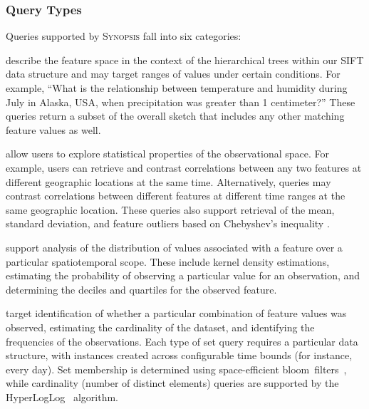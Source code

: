 \subsubsection{Query Types}
Queries supported by \textsc{Synopsis} fall into six categories:
\begin{description}[leftmargin=*]
    \item[Relational Queries] describe the feature space in the context of the hierarchical trees within our SIFT data structure and may target ranges of values under certain conditions. For example, ``What is the relationship between temperature and humidity during July in Alaska, USA, when precipitation was greater than 1 centimeter?'' These queries return a subset of the overall sketch that includes any other matching feature values as well.

    \item[Statistical Queries] allow users to explore statistical properties of the observational space. For example, users can retrieve and contrast correlations between any two features at different geographic locations at the same time. Alternatively, queries may contrast correlations between different features at different time ranges at the same geographic location. These queries also support retrieval of the mean, standard deviation, and feature outliers based on Chebyshev's inequality \cite{knuth1968art}.

    \item[Density Queries] support analysis of the distribution of values associated with a feature over a particular spatiotemporal scope. These include kernel density estimations, estimating the probability of observing a particular value for an observation, and determining the deciles and quartiles for the observed feature.%

    \item[Set Queries] target identification of whether a particular combination of feature values was observed, estimating the cardinality of the dataset, and identifying the frequencies of the observations. Each type of set query requires a particular data structure, with instances created across configurable time bounds (for instance, every day). Set membership is determined using space-efficient bloom~filters~\cite{bloom1970space}, while cardinality (number of distinct elements) queries are supported by the HyperLogLog~\cite{flajolet2007hyperloglog} algorithm.


\end{description}
